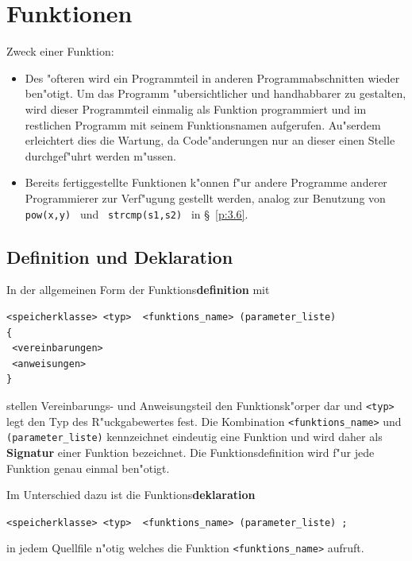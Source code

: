 \chapter{Funktionen}
\label{p:7}
%
Zweck einer Funktion:
\begin{itemize}
  \item Des "ofteren wird ein Programmteil in anderen Programmabschnitten
  	wieder ben"otigt. Um das Programm "ubersichtlicher und handhabbarer
	zu gestalten, wird dieser Programmteil einmalig als Funktion
	programmiert und im restlichen Programm mit seinem Funktionsnamen
	aufgerufen. Au"serdem erleichtert dies die Wartung, da Code"anderungen
	nur an dieser einen Stelle durchgef"uhrt werden m"ussen.
  \item Bereits fertiggestellte Funktionen k"onnen f"ur andere Programme
  	anderer Programmierer zur Verf"ugung gestellt werden,
	analog zur Benutzung von \verb|  pow(x,y) | und
	\verb| strcmp(s1,s2) |  in \S~\ref{p:3.6}.
\end{itemize}
%
\section{Definition und Deklaration}
\label{p:7.1}
%
In der allgemeinen Form der Funktions\textbf{definition} mit

\mbox{}\hfill
\begin{minipage}[t]{0.9\textwidth}
\begin{verbatim}
<speicherklasse> <typ>  <funktions_name> (parameter_liste)
{
 <vereinbarungen>
 <anweisungen>
}
\end{verbatim}
\end{minipage}
\hfill\mbox{}

%
stellen Vereinbarungs- und Anweisungsteil den Funktionsk"orper dar und
\verb|<typ>| legt  den Typ des R"uckgabewertes fest.
Die Kombination \verb|<funktions_name>| und  \verb|(parameter_liste)|
kennzeichnet eindeutig eine Funktion und wird daher als
\textbf{Signatur} einer Funktion bezeichnet.
Die Funktionsdefinition wird f"ur jede Funktion genau einmal ben"otigt.
%

Im Unterschied dazu ist die Funktions\textbf{deklaration}

\mbox{}\hfill
\verb|<speicherklasse> <typ>  <funktions_name> (parameter_liste) ;|
\hfill\mbox{}

in jedem Quellfile n"otig welches die Funktion \verb|<funktions_name>|
aufruft.

